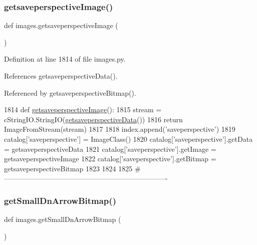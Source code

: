 \mbox{\label{namespaceimages_a59a28f3572347d6753c73514a00bb81e}} 
\subsubsection{\texorpdfstring{getsaveperspective\+Image()}{getsaveperspectiveImage()}}
{\footnotesize\ttfamily def images.\+getsaveperspective\+Image (\begin{DoxyParamCaption}{ }\end{DoxyParamCaption})}



Definition at line 1814 of file images.\+py.



References getsaveperspective\+Data().



Referenced by getsaveperspective\+Bitmap().


\begin{DoxyCode}
1814 \textcolor{keyword}{def }\hyperlink{namespaceimages_a59a28f3572347d6753c73514a00bb81e}{getsaveperspectiveImage}():
1815     stream = cStringIO.StringIO(\hyperlink{namespaceimages_a5c65b00e1312b2ea05eefb933a4b0b05}{getsaveperspectiveData}())
1816     \textcolor{keywordflow}{return} ImageFromStream(stream)
1817 
1818 index.append(\textcolor{stringliteral}{'saveperspective'})
1819 catalog[\textcolor{stringliteral}{'saveperspective'}] = ImageClass()
1820 catalog[\textcolor{stringliteral}{'saveperspective'}].getData = getsaveperspectiveData
1821 catalog[\textcolor{stringliteral}{'saveperspective'}].getImage = getsaveperspectiveImage
1822 catalog[\textcolor{stringliteral}{'saveperspective'}].getBitmap = getsaveperspectiveBitmap
1823 
1824 
1825 \textcolor{comment}{#----------------------------------------------------------------------}
\end{DoxyCode}
\mbox{\label{namespaceimages_a5aa232215269c0c30d855391625bfd12}} 
\subsubsection{\texorpdfstring{get\+Small\+Dn\+Arrow\+Bitmap()}{getSmallDnArrowBitmap()}}
{\footnotesize\ttfamily def images.\+get\+Small\+Dn\+Arrow\+Bitmap (\begin{DoxyParamCaption}{ }\end{DoxyParamCaption})}



